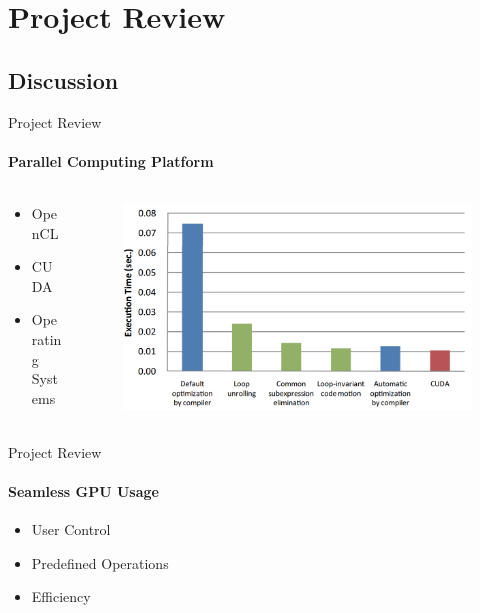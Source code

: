 \section{Project Review}

	\subsection{Discussion}
	\begin{frame}[t]{Project Review}\framesubtitle{Parallel Computing Platform}
	\begin{columns}[T]
	\begin{column}{0.48\textwidth}
		\begin{itemize}
			\item OpenCL
			\item CUDA
			\item Operating Systems
		\end{itemize}
	\end{column}
	\begin{column}{.48\textwidth}
      \begin{figure}
         \includegraphics[width=1\textwidth]{images/opencloptimisation.png}
      \end{figure}
    \end{column}
    \end{columns}
	\end{frame}

	\begin{frame}[t]{Project Review}\framesubtitle{Seamless GPU Usage}
		\begin{itemize}
			\item User Control
			\item Predefined Operations
			\item Efficiency
		\end{itemize}
	\end{frame}

